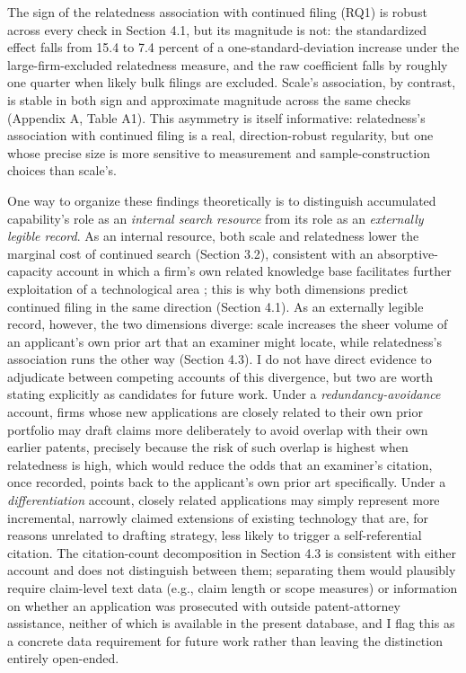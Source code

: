 \documentclass[12pt]{article}
\begin{document}
The sign of the relatedness association with continued filing (RQ1) is robust across every check in Section 4.1, but its magnitude is not: the standardized effect falls from 15.4 to 7.4 percent of a one-standard-deviation increase under the large-firm-excluded relatedness measure, and the raw coefficient falls by roughly one quarter when likely bulk filings are excluded. Scale's association, by contrast, is stable in both sign and approximate magnitude across the same checks (Appendix A, Table A1). This asymmetry is itself informative: relatedness's association with continued filing is a real, direction-robust regularity, but one whose precise size is more sensitive to measurement and sample-construction choices than scale's.

One way to organize these findings theoretically is to distinguish accumulated capability's role as an \emph{internal search resource} from its role as an \emph{externally legible record}. As an internal resource, both scale and relatedness lower the marginal cost of continued search (Section 3.2), consistent with an absorptive-capacity account in which a firm's own related knowledge base facilitates further exploitation of a technological area \citep{cohenlevinthal1990}; this is why both dimensions predict continued filing in the same direction (Section 4.1). As an externally legible record, however, the two dimensions diverge: scale increases the sheer volume of an applicant's own prior art that an examiner might locate, while relatedness's association runs the other way (Section 4.3). I do not have direct evidence to adjudicate between competing accounts of this divergence, but two are worth stating explicitly as candidates for future work. Under a \emph{redundancy-avoidance} account, firms whose new applications are closely related to their own prior portfolio may draft claims more deliberately to avoid overlap with their own earlier patents, precisely because the risk of such overlap is highest when relatedness is high, which would reduce the odds that an examiner's citation, once recorded, points back to the applicant's own prior art specifically. Under a \emph{differentiation} account, closely related applications may simply represent more incremental, narrowly claimed extensions of existing technology that are, for reasons unrelated to drafting strategy, less likely to trigger a self-referential citation. The citation-count decomposition in Section 4.3 is consistent with either account and does not distinguish between them; separating them would plausibly require claim-level text data (e.g., claim length or scope measures) or information on whether an application was prosecuted with outside patent-attorney assistance, neither of which is available in the present database, and I flag this as a concrete data requirement for future work rather than leaving the distinction entirely open-ended.
\end{document}
